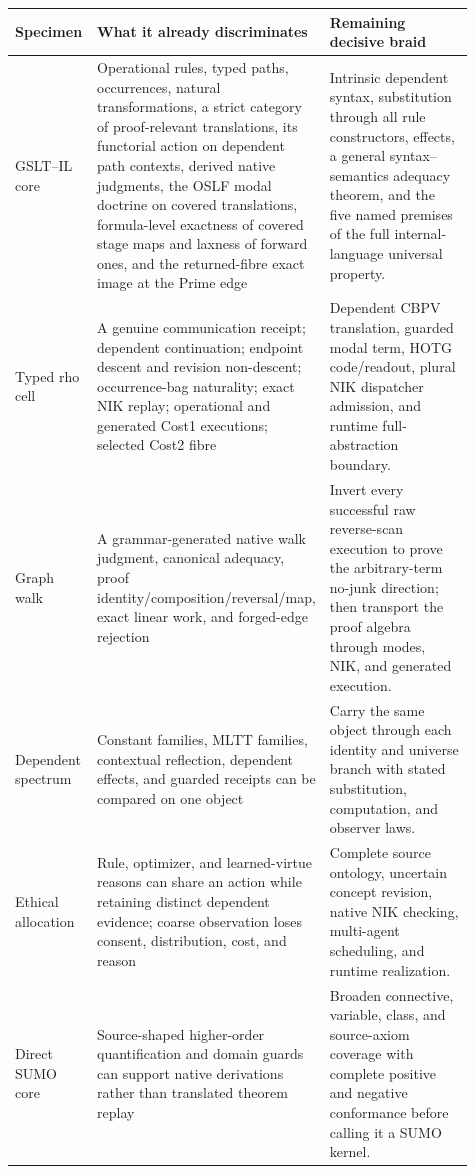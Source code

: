 \documentclass[11pt]{article}
\theoremstyle{definition}
\theoremstyle{remark}
\begin{document}
\begin{longtable}{>{\raggedright\arraybackslash}p{0.18\linewidth}%
                  >{\raggedright\arraybackslash}p{0.36\linewidth}%
                  >{\raggedright\arraybackslash}p{0.37\linewidth}}
\toprule
Specimen & What it already discriminates & Remaining decisive braid \\
\midrule
\endhead
GSLT--IL core & Operational rules, typed paths, occurrences, natural
  transformations, a strict category of proof-relevant translations, its
  functorial action on dependent path contexts, derived native judgments, the OSLF modal doctrine on
  covered translations, formula-level exactness of covered stage maps and
  laxness of forward ones, and the returned-fibre exact image at the Prime edge
  & Intrinsic dependent syntax, substitution through all rule constructors,
  effects, a general syntax--semantics adequacy theorem, and the five named
  premises of the full internal-language universal property. \\
Typed rho cell & A genuine communication receipt; dependent continuation;
  endpoint descent and revision non-descent; occurrence-bag naturality; exact
  NIK replay; operational and generated Cost1 executions; selected Cost2 fibre &
  Dependent CBPV translation, guarded modal term, HOTG code/readout, plural NIK
  dispatcher admission, and runtime full-abstraction boundary. \\
Graph walk & A grammar-generated native walk judgment, canonical adequacy,
  proof identity/composition/reversal/map, exact linear work, and forged-edge
  rejection & Invert every successful raw reverse-scan execution to prove the
  arbitrary-term no-junk direction; then transport the proof algebra through
  modes, NIK, and generated execution. \\
Dependent spectrum & Constant families, MLTT families, contextual reflection,
  dependent effects, and guarded receipts can be compared on one object & Carry
  the same object through each identity and universe branch with stated
  substitution, computation, and observer laws. \\
Ethical allocation & Rule, optimizer, and learned-virtue reasons can share an
  action while retaining distinct dependent evidence; coarse observation loses
  consent, distribution, cost, and reason & Complete source ontology, uncertain
  concept revision, native NIK checking, multi-agent scheduling, and runtime
  realization. \\
Direct SUMO core & Source-shaped higher-order quantification and domain guards
  can support native derivations rather than translated theorem replay & Broaden
  connective, variable, class, and source-axiom coverage with complete positive
  and negative conformance before calling it a SUMO kernel. \\
\bottomrule
\end{longtable}
\end{document}
